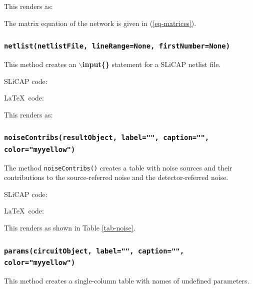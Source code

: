 \documentclass[a4paper,12pt]{article}
\begin{document}
This renders as:

The matrix equation of the network is given in (\ref{eq-matrices}).


\subsubsection{\texttt{netlist(netlistFile, lineRange=None, firstNumber=None)}}

This method creates an $\backslash${\textbf{input\{\}}} statement for a SLiCAP netlist file.

SLiCAP code:



\LaTeX$\,$ code:



This renders as:



\subsubsection{\texttt{noiseContribs(resultObject, label="", caption="", \\ color="myyellow")}}

The method {\texttt{noiseContribs()}} creates a table with noise sources and their contributions to the source-referred noise and the detector-referred noise.

SLiCAP code:



\LaTeX$\,$ code:



This renders as shown in Table \ref{tab-noise}.



\subsubsection{\texttt{params(circuitObject, label="", caption="", color="myyellow")}}

This method creates a single-column table with names of undefined parameters.
\end{document}
